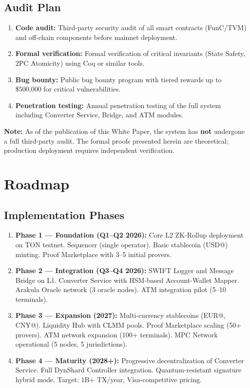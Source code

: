 \documentclass[12pt,a4paper]{article}
\theoremstyle{definition}
\theoremstyle{remark}
\newcommand{\USD}[1]{\$#1}
\begin{document}
\subsection{Audit Plan}
\label{sec:audit-plan}

\begin{enumerate}[nosep]
    \item \textbf{Code audit:} Third-party security audit of all smart contracts (FunC/TVM) and off-chain components before mainnet deployment.
    \item \textbf{Formal verification:} Formal verification of critical invariants (State Safety, 2PC Atomicity) using Coq or similar tools.
    \item \textbf{Bug bounty:} Public bug bounty program with tiered rewards up to \USD{500{,}000} for critical vulnerabilities.
    \item \textbf{Penetration testing:} Annual penetration testing of the full system including Converter Service, Bridge, and ATM modules.
\end{enumerate}

\textbf{Note:} As of the publication of this White Paper, the system has \textbf{not} undergone a full third-party audit. The formal proofs presented herein are theoretical; production deployment requires independent verification.


\section{Roadmap}
\label{sec:roadmap}

\subsection{Implementation Phases}

\begin{enumerate}[nosep]
    \item \textbf{Phase 1 --- Foundation (Q1--Q2 2026):} Core L2 ZK-Rollup deployment on TON testnet. Sequencer (single operator). Basic stablecoin (USD@) minting. Proof Marketplace with 3--5 initial provers.
    \item \textbf{Phase 2 --- Integration (Q3--Q4 2026):} SWIFT Logger and Message Bridge on L1. Converter Service with HSM-based Account-Wallet Mapper. Arakula Oracle network (3 oracle nodes). ATM integration pilot (5--10 terminals).
    \item \textbf{Phase 3 --- Expansion (2027):} Multi-currency stablecoins (EUR@, CNY@). Liquidity Hub with CLMM pools. Proof Marketplace scaling (50+ provers). ATM network expansion (100+ terminals). MPC Network operational (5 nodes, 5 jurisdictions).
    \item \textbf{Phase 4 --- Maturity (2028+):} Progressive decentralization of Converter Service. Full DynShard Controller integration. Quantum-resistant signature hybrid mode. Target: 1B+ TX/year, Visa-competitive pricing.
\end{enumerate}
\end{document}
